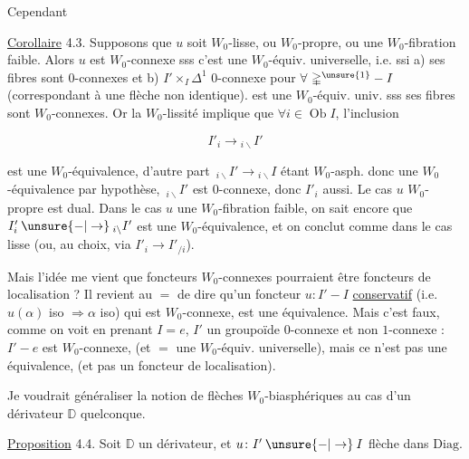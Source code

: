 Cependant

\uline{Corollaire} 4.3. Supposons que $u$ soit $W_0$-lisse, ou $W_0$-propre, ou une $W_0$-fibration faible. Alors $u$ est $W_0$-connexe sss c'est une $W_0$-équiv. universelle, i.e. ssi a) ses fibres sont $0$-connexes et b) $I'\times_I\mathbb{\Delta}^1$ $0$-connexe pour $\forall\ \mathbb{\Delta}^{\unsure{1}}\mathbin{-}I$ (correspondant à une flèche non identique).
 est une $W_0$-équiv. univ. sss ses fibres sont $W_0$-connexes. Or la $W_0$-lissité implique que  $\forall i\in\operatorname{Ob}I$, l'inclusion

\[
 I'_i\longrightarrow{}_{i\backslash}I'
\]

est une $W_0$-équivalence, d'autre part $\,{}_{i\backslash}I'\longrightarrow{}_{i\backslash}I$ étant $W_0$-asph. donc une $W_0$-équivalence\unsure{,} par hypothèse, $\,{}_{i\backslash}I'$ est $0$-connexe, donc $I'_i$ aussi. Le cas $u$ $W_0$-propre est dual. Dans le cas $u$ une $W_0$-fibration faible, on sait encore que  $I'_i\mathbin{\unsure{-|\to}}{}_{i\backslash}I'$ est une $W_0$-équivalence, et on conclut comme dans le cas lisse (ou, au choix, via $I'_i\longrightarrow I'_{/i}$).

Mais l'idée me vient que  foncteurs $W_0$-connexes pourraient être   foncteurs de localisation ? Il revient au $=$ de dire qu'un foncteur $u\colon I'\mathbin{-}I$  \uline{conservatif} (i.e. $u(\alpha)$ iso $\Rightarrow\alpha$ iso) qui est $W_0$-connexe, est une équivalence. Mais c'est faux, comme on voit en prenant $I=e$, $I'$ un groupoïde $0$-connexe et non $1$-connexe : $I'\mathbin{-}e$ est $W_0$-connexe, (et $=$ une $W_0$-équiv. universelle), mais ce n'est pas une équivalence, (et pas un foncteur de localisation).

Je voudrait généraliser  la notion de flèches $W_0$-biasphériques au cas d'un dérivateur $\mathbb{D}$ quelconque. 

\uline{Proposition} 4.4. Soit $\mathbb{D}$ un dérivateur, et $u\colon I'\mathbin{\unsure{-|\to}}I$  flèche dans $\mathrm{Diag}$.  


